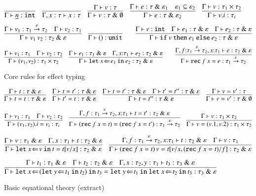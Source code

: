 \documentclass[orivec]{llncs}
\newif\iffull\fullfalse
\newcommand{\keywd}[1]{\mathtt{#1}}
\newcommand{\effto}[1]{\stackrel{#1}{\to}}
\newcommand{\inttype}{\keywd{int}}
\newcommand{\unittype}{\keywd{unit}}
\newcommand{\unitval}{\keywd{()}}
\newcommand{\vfix}[3]{\keywd{rec}\:{#1}\:{#2} = {#3}}
\newcommand{\letin}[2]{\keywd{let}\:{#1}\!\Leftarrow\!{#2}\:\keywd{in}\:}
\newcommand{\myif}[3]{\keywd{if}\ #1\ \keywd{then}\ #2\
  \keywd{else}\ #3}
\newcommand{\eff}{\varepsilon}
\newcommand{\ety}[2]{{#1}\mathrel{\&}{#2}}
\newcommand{\valty}[1]{#1}
\begin{document}
\begin{figure*}[tph]
\vspace{-3mm}
\[
\infer{\Gamma\vdash \underline{n} : \valty{\inttype}}{}
\quad 
\infer{\Gamma,x:\tau\vdash x : \valty{\tau}}{}
\quad
\infer{\Gamma\vdash v:\ety{\tau}{\emptyset}}{\Gamma\vdash v:\valty{\tau}}
\quad
\infer{\Gamma\vdash e:\ety{\tau}{\eff_2}}{\Gamma\vdash
e:\ety{\tau}{\eff_1} & \eff_1
\subseteq  \eff_2}
\quad 
\infer{\Gamma\vdash v.i:\valty{\tau_i}}{\Gamma\vdash
v:\valty{\tau_1\times\tau_2}}
\]
\[
\infer{\Gamma\vdash v_1\ v_2 : \ety{\tau_2}{\eff}}
{\Gamma\vdash v_1:\valty{\tau_1\effto{\eff}\tau_2} & \Gamma\vdash
v_2:\valty{\tau_1}}
\quad
\infer{\Gamma \vdash \unitval : \unittype}{}
\qquad
 \infer{\Gamma\vdash\myif{v}{e_1}{e_2} : \ety{\tau}{\eff}}
{\Gamma\vdash v:\valty{\inttype} & \Gamma\vdash e_1:\ety{\tau}{\eff} & \Gamma\vdash e_2:\ety{\tau}{\eff}}
\]
\[
\infer{\Gamma\vdash
(v_1,v_2):\valty{\tau_1\times\tau_2}}
{\Gamma\vdash v_1:\valty{\tau_1} & 
\Gamma\vdash v_2:\valty{\tau_2}}
\quad
\infer{\Gamma\vdash \letin{x}{e_1}{e_2}:\ety{\tau_2}{\eff}}
{\Gamma\vdash e_1:\ety{\tau_1}{\eff} & \Gamma,x{:}\tau_1\vdash e_2:\ety{\tau_2}{\eff}}
\qquad 
\infer{\Gamma\vdash \vfix{f}{x}{e} : \valty{\tau_1\effto{\eff} \tau_2}}
{\Gamma,f{:}\tau_1\effto\eff \tau_2,x{:}\tau_1\vdash
e:\ety{\tau_2}{\eff}}
\]
\caption{Core rules for effect typing\label{tyres}\label{efte}}
\vspace{-5mm}
\end{figure*}
\begin{figure*}[tph]
\vspace{-3mm}
\[
\infer{\Gamma\vdash t=t:\ety{\tau}{\eff}}
{\Gamma\vdash t:\ety{\tau}{\eff}} 
\quad
\infer{\Gamma\vdash t'=t:\ety{\tau}{\eff}}
{\Gamma\vdash t=t':\ety{\tau}{\eff}} 
\quad 
\infer{\Gamma\vdash t=t'':\ety{\tau}{\eff}}
{\Gamma\vdash t=t':\ety{\tau}{\eff} & \Gamma\vdash
t'=t'':\ety{\tau}{\eff}}
\quad 
\infer{\Gamma\vdash v=v':\ety{\tau}{\emptyset}}
{\Gamma\vdash v=v':\valty{\tau}}
\]
\iffull \vspace{2pt} \fi
\[
\infer{\Gamma\vdash (v_1,v_2).i = v_i :\valty{\tau_i}}
{\Gamma\vdash v_1:\valty{\tau_1} & \Gamma\vdash
v_2:\valty{\tau_2}}
\quad
\infer{\Gamma\vdash
(\vfix{f}{x}{t})=(\vfix{f}{x}{t'}):\valty{\tau_1\effto\eff
\tau_2}}
{\Gamma,f:\tau_1\effto\eff \tau_2, x{:}\tau_1\vdash
t=t':\ety{\tau_2}{\eff}}
\quad
\infer{\Gamma\vdash v=(v.1,v.2):\valty{\tau_1\times\tau_2}}
{\Gamma\vdash v:\valty{\tau_1\times\tau_2}}
\]
\iffull \vspace{2pt} \fi
\[ 
\infer{\Gamma\vdash\letin{x}{v}{t} = t[v/x] : \ety{\tau_2}{\eff}}
{\Gamma\vdash v:\ety{\tau_1}{\eff} & \Gamma,x:\tau_1\vdash
t:\ety{\tau_2}{\eff}}
\quad
\infer{\Gamma\vdash (\vfix{f}{x}{t})\,v = t[v/x, (\vfix{f}{x}{t})/f]:
\ety{\tau_2}{\eff}}
{\Gamma,f:\tau_1\effto\eff \tau_2, x{:}\tau_1\vdash
t:\ety{\tau_2}{\eff} & \Gamma\vdash v:\tau_1}
\]
\iffull \vspace{2pt} \fi
\[ 
\infer{\Gamma\vdash\letin{x}{(\letin{y}{t_1}{t_2})}{t_3} =
\letin{y}{t_1}{\letin{x}{t_2}{t_3}} : \ety{\tau_3}{\eff}}
{\Gamma\vdash t_1:\ety{\tau_1}{\eff} & \Gamma\vdash
t_2:\ety{\tau_2}{\eff} & \Gamma,x:\tau_2,y:\tau_1\vdash
t_3:\ety{\tau_3}{\eff}}
\]
\caption{Basic equational theory (extract)\label{eqth}}
\iffull
\else
\vspace{-2mm}
\fi
\end{figure*}
\end{document}
